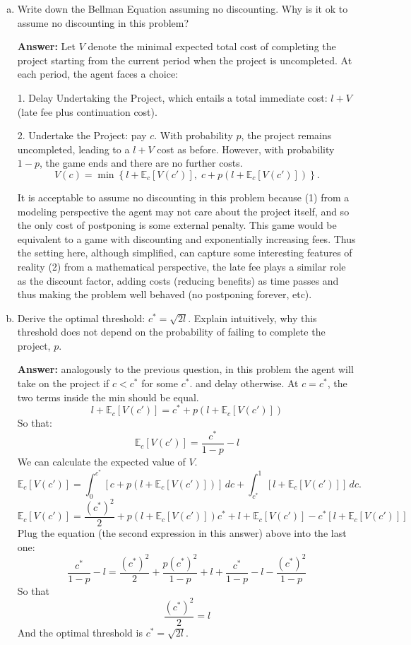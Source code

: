 \documentclass[11pt]{extarticle}
\theoremstyle{plain}
\theoremstyle{definition}
\begin{document}
\vspace{2mm}
\begin{enumerate}[(a)]
\item Write down the Bellman Equation assuming no discounting. Why is it ok to assume no discounting in this problem?

\textbf{Answer:} 
Let \( V \) denote the minimal expected total cost of completing the project starting from the current period when the project is uncompleted. At each period, the agent faces a choice:

1. Delay Undertaking the Project, which entails a total immediate cost: \( l + V \)  (late fee plus continuation cost).

2. Undertake the Project: pay $c$. With probability \( p \), the project remains uncompleted, leading to a \( l + V \) cost as before. However, with probability \( 1- p \), the game ends and there are no further costs.
\[
V(c) = \min \left\{ l + \mathbb{E}_c \left[ V(c') \right], \; c + p (l+\mathbb{E}_c \left[ V(c') \right])  \right\}.
\]

It is acceptable to assume no discounting in this problem because (1) from a modeling perspective the agent may not care about the project itself, and so the only cost of postponing is some external penalty. This game would be equivalent to a game with discounting and exponentially increasing fees. Thus the setting here, although simplified, can capture some interesting features of reality (2) from a mathematical perspective, the late fee plays a similar role as the discount factor, adding costs (reducing benefits) as time passes and thus making the problem well behaved (no postponing forever, etc).

\item Derive the optimal threshold: $c^* = \sqrt{2l}$. Explain intuitively, why this threshold does not depend on the probability of failing to complete the project, $p$. 

\textbf{Answer:} analogously to the previous question, in this problem the agent will take on the project if $c<c^*$ for some $c^*$. and delay otherwise. At $c=c^*$, the two terms inside the min should be equal.
$$l + \mathbb{E}_c \left[ V(c') \right] = c^* + p (l+\mathbb{E}_c \left[ V(c') \right]) $$
So that:
$$\mathbb{E}_c \left[ V(c') \right] = \frac{c^*}{1-p}-l$$
We can calculate the expected value of $V$.
\[
\mathbb{E}_{c}\left[ V(c') \right] = \int_{0}^{c^*} [c + p (l+ \mathbb{E}_{c}\left[ V(c') \right])] \, dc + \int_{c^*}^{1} [l + \mathbb{E}_{c}\left[ V(c') \right]] \, dc.
\]
\[
\mathbb{E}_c \left[ V(c') \right] = \frac{(c^*)^2}{2} + p (l+ \mathbb{E}_c \left[ V(c') \right])c^* + l + \mathbb{E}_c \left[ V(c') \right] - {c^*} [l + \mathbb{E}_c \left[ V(c') \right]] 
\]
Plug the equation (the second expression in this answer) above into the last one:
\[
\frac{c^*}{1-p}-l = \frac{(c^*)^2}{2} + \frac{p (c^*)^2}{1-p} +l+ \frac{c^*}{1-p}-l - \frac{(c^*)^2}{1-p} 
\]
So that 
$$\frac{(c^*)^2}{2}=l$$
And the optimal threshold  is \( c^* = \sqrt{2l} \).


\end{enumerate}
\end{document}
